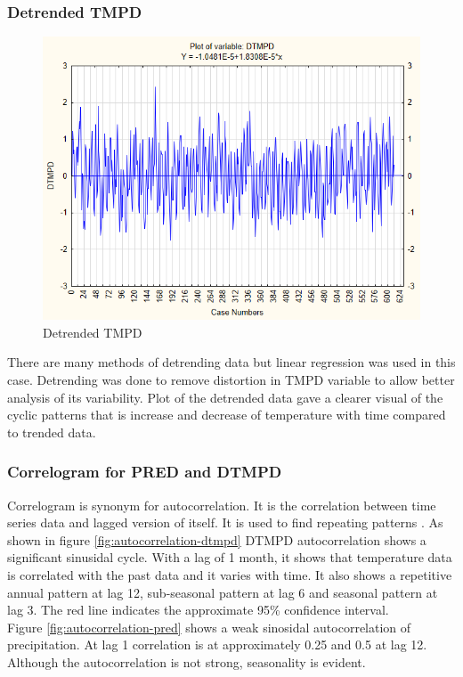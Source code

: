 \documentclass[12pt,a4paper]{article}
\begin{document}
\subsubsection{Detrended TMPD}
\begin{figure}[h]
	\centering
	\includegraphics[width=0.7\linewidth]{"../Assignment 2/Detrended DTMPD"}
	\caption{Detrended TMPD}
	\label{fig:detrended-tmpd}
\end{figure}
\noindent There are many methods of detrending data but linear regression was used in this case. Detrending was done to remove distortion in TMPD variable to allow better analysis of its variability. Plot of the detrended data gave a clearer visual of the cyclic patterns that is increase and decrease of temperature with time compared to trended data. 

\subsubsection{Correlogram for PRED and DTMPD}
Correlogram is synonym for autocorrelation. It is the correlation between time series data and lagged version of itself. It is used to find repeating patterns \cite{hamilton1994time}. As shown in figure \ref{fig:autocorrelation-dtmpd} DTMPD autocorrelation shows a significant sinusidal cycle. With a lag of 1 month, it shows that temperature data is correlated with the past data and it varies with time. It also shows a repetitive annual pattern at lag 12, sub-seasonal pattern at lag 6 and seasonal pattern at lag 3. The red line indicates the approximate 95\% confidence interval.\\

\noindent Figure \ref{fig:autocorrelation-pred} shows a weak sinosidal autocorrelation of precipitation. At lag 1 correlation is at approximately 0.25 and 0.5 at lag 12. Although the autocorrelation is not strong, seasonality is evident.
\end{document}
